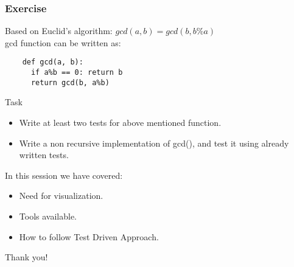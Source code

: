 \documentclass[compress,14pt]{beamer}
\newcounter{time}
\newcommand{\inctime}[1]{\addtocounter{time}{#1}{\vspace*{0.1in}\tiny \thetime\ m}}
\begin{document}
\begin{frame}[fragile]
    \frametitle{Exercise}
    Based on Euclid's algorithm:
        $gcd(a,b)=gcd(b,b\%a)$\\
    gcd function can be written as:
    \begin{lstlisting}
    def gcd(a, b):
      if a%b == 0: return b
      return gcd(b, a%b)
    \end{lstlisting}
    \vspace*{-0.15in}
    \begin{block}{Task}
      \begin{itemize}
      \item Write at least 
        two tests for above mentioned function.
      \item Write a non recursive implementation
      of gcd(), and test it using already 
      written tests.
      \end{itemize}
    \end{block}
    
\inctime{15} 
\end{frame}

\begin{frame}{In this session we have covered:}
  \begin{itemize}
    \item Need for visualization.
    \item Tools available.
    \item How to follow Test Driven Approach.
  \end{itemize}
\end{frame}
\begin{frame}
    \begin{center}
        \Huge    
        Thank you!
    \end{center}
\end{frame}
\end{document}
